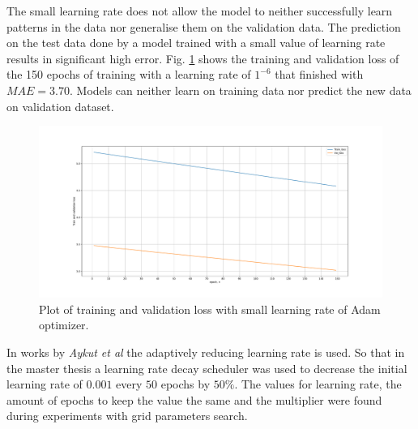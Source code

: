 The small learning rate does not allow the model to neither successfully learn patterns in the data nor generalise them on the validation data. The prediction on the test data done by a model trained with a small value of learning rate results in significant high error. Fig. \ref{fig:lr} shows the training and validation loss of the 150 epochs of training with a learning rate of $1^{-6}$ that finished with $MAE = 3.70$. Models can neither learn on training data nor predict the new data on validation dataset. 
\begin{figure}[htb]
	\begin{center}
		\includegraphics[width=1\textwidth, keepaspectratio]{gfx/lstm1_lr_low.pdf}
		\caption{\label{fig:lr} Plot of training and validation loss with small learning rate of Adam optimizer.}
	\end{center}
\end{figure}

In works \cite{delay_compensation_360, telepresence} by \textit{Aykut et al} the adaptively reducing learning rate is used. So that in the master thesis a learning rate decay scheduler was used to decrease the initial learning rate of $0.001$ every $50$ epochs by $50\%$. The values for learning rate, the amount of epochs to keep the value the same and the multiplier were found during experiments with grid parameters search. 

